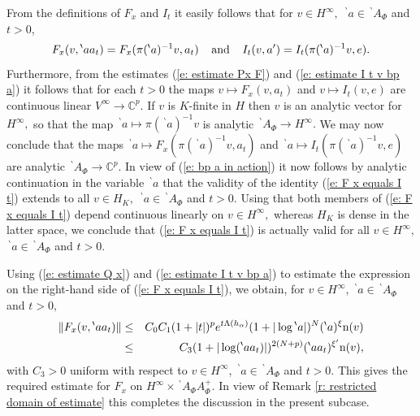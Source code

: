 \documentclass[12pt,a4paper]{article}
\def\text#1{\;\;\;\;{\rm \hbox{#1}}\;\;\;\;}
\def\msy#1{{\mathbb #1}}
\def\C{{\msy C}}
\def\ga{\alpha}
\def\to{\rightarrow}
\numberwithin{Thm}{section}
\numberwithin{equation}{section}
\def\gL{\Lambda}
\numberwithin{equation}{section}
\def\gL{\Lambda}
\def\bp{\!{\,}^\backprime}
\begin{document}
From the definitions of $F_x$ and $I_t$ it easily follows that for $v \in H^\infty,$ 
$\bp a\in \bp A_\Phi$ and $t > 0$,
\begin{equation}
\label{e: bp a in action}
F_x(v, \bp a a_t) = F_x(\pi(\bp a)^{-1}v, a_t) \text{and} I_t(v, a') = I_t(\pi(\bp a)^{-1}v, e).
\end{equation}
Furthermore, from the estimates (\ref{e: estimate Px F}) and (\ref{e: estimate I t v bp a}) it follows that for each $t > 0$ the maps 
$v \mapsto F_x(v,a_t)$ and $v \mapsto I_t(v, e)$ are continuous linear $V^\infty \to \C^p.$ If $v$ is $K$-finite in $H$ then $v$ is an analytic vector for $H^\infty,$ 
so that the map $\bp a \mapsto \pi(\bp a)^{-1} v$ is analytic $\bp A_\Phi \to H^\infty.$ 
We may now conclude that the maps $\bp a \mapsto F_x(\pi(\bp a)^{-1}v, a_t)$ 
and $\bp a \mapsto I_t(\pi(\bp a)^{-1}v, e)$ are analytic $\bp A_\Phi \to \C^p.$ 
In view of (\ref{e: bp a in action}) it now follows by analytic continuation in the variable $\bp a$ 
that the validity of the identity (\ref{e: F x equals I t}) extends to all $v \in H_K,$ $\bp a \in \bp A_\Phi$ and $t > 0.$ Using that both members of (\ref{e: F x equals I t}) depend continuous linearly on $v \in H^\infty,$ whereas $H_K$ is dense in the latter space, we conclude that (\ref{e: F x equals I t}) is actually valid
for all $v \in H^\infty,$ $\bp a \in \bp A_\Phi$ and $t >0.$ 

Using (\ref{e: estimate Q x}) and (\ref{e: estimate I t v bp a}) to estimate  
the expression on the right-hand side of (\ref{e: F x equals I t}), we obtain,
for $v \in H^\infty$, $\bp a \in \bp A_\Phi$ and $t > 0,$ 
\begin{eqnarray*}
\|F_x(v, \bp a a_t)\| & \leq &  C_0 C_1 (1 + |t|)^p e^{t \gL(h_\ga)}(1 + |\log \bp a|)^N (\bp a)^\xi {\rm n } ( v)\\
&\leq& 
C_3  (1 + |\log (\bp a a_t)|)^{2(N + p)} (\bp a a_t)^{\xi '} {\rm n}(v),
\end{eqnarray*}
with $C_3>0$ uniform with respect to $v \in H^\infty$, $\bp a\in \bp A_\Phi$ 
and $t> 0.$ This gives the required estimate for $F_x$ on $H^\infty \times \bp A_\Phi A_\Phi^+.$ In view of Remark \ref{r: restricted domain of estimate} this  completes
the discussion in the present subcase.
\end{document}
